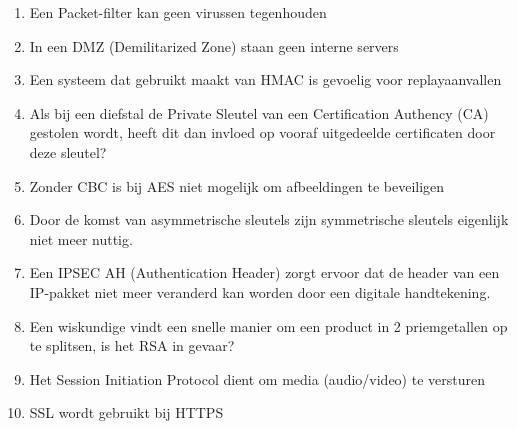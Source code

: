 \begin{enumerate}
\begin{enumerate}

        \item Een Packet-filter kan geen virussen tegenhouden


        \item In een DMZ (Demilitarized Zone) staan geen interne servers


        \item Een systeem dat gebruikt maakt van HMAC is gevoelig voor replayaanvallen


        \item Als bij een diefstal de Private Sleutel van een Certification Authency (CA) gestolen wordt, heeft dit dan invloed op vooraf uitgedeelde certificaten door deze sleutel?


        \item Zonder CBC is bij AES niet mogelijk om afbeeldingen te beveiligen


        \item Door de komst van asymmetrische sleutels zijn symmetrische sleutels eigenlijk niet meer nuttig.


        \item Een IPSEC AH (Authentication Header) zorgt ervoor dat de header van een IP-pakket niet meer veranderd kan worden door een digitale handtekening.


        \item Een wiskundige vindt een snelle manier om een product in 2 priemgetallen op te splitsen, is het RSA in gevaar?


        \item Het Session Initiation Protocol dient om media (audio/video) te versturen


        \item SSL wordt gebruikt bij HTTPS
                

                

\end{enumerate}
\end{enumerate}
